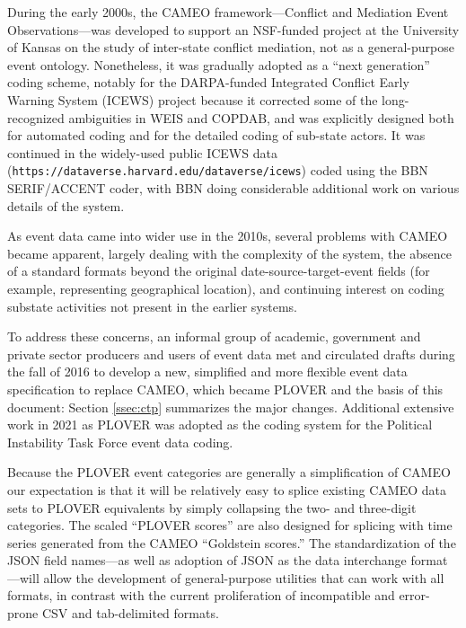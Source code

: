 \documentclass[11pt]{report}
\newcommand{\txt}[1]{\texttt{#1}}
\begin{document}
During the early 2000s, the CAMEO framework---Conflict and Mediation Event Observations---was developed \citep{SGY09} to support an NSF-funded project at the University of Kansas on the study of inter-state conflict mediation, not as a general-purpose event ontology. Nonetheless, it was gradually adopted as a ``next generation'' coding scheme, notably for the DARPA-funded Integrated Conflict Early Warning System (ICEWS) project \citep{OBrien10} because it corrected some of the long-recognized ambiguities in WEIS and COPDAB, and was explicitly designed both for automated coding and for the detailed coding of sub-state actors. It was continued in the widely-used public ICEWS data (\txt{https://dataverse.harvard.edu/dataverse/icews}) coded using the BBN SERIF/ACCENT coder, with BBN doing considerable additional work on various details of the system.

As event data came into wider use in the 2010s, several problems with CAMEO became apparent, largely dealing with the complexity of the system, the absence of a standard formats beyond the original  date-source-target-event fields (for example, representing geographical location), and continuing interest on coding substate activities not present in the earlier systems. 

To address these concerns, an informal group of academic, government and private sector producers and users of event data met and circulated drafts during the fall of 2016 to develop a new, simplified and more flexible event data specification to replace CAMEO, which became PLOVER and the basis of this document: Section \ref{ssec:ctp} summarizes the major changes. Additional extensive work in 2021 as PLOVER was adopted as the coding system for the Political Instability Task Force event data coding. 

Because the PLOVER event categories are generally a simplification of CAMEO our expectation is that it will be relatively easy to splice existing CAMEO data sets to PLOVER equivalents by simply collapsing the two- and three-digit categories. The scaled ``PLOVER scores'' are also designed for splicing with time series generated from the CAMEO ``Goldstein scores.'' The standardization of the JSON field names---as well as adoption of JSON as the data interchange format---will allow the development of general-purpose utilities that can work with all formats, in contrast with the current proliferation of incompatible and error-prone CSV and tab-delimited formats.
\end{document}
